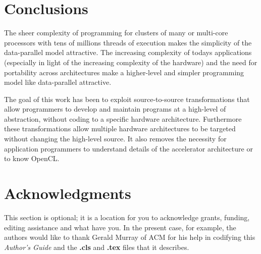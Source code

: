 \documentclass{acm_proc_article-sp}
\begin{document}





%


\section{Conclusions}

The sheer complexity of programming for clusters of many or multi-core
processors with tens of millions threads of execution makes the simplicity of
the data-parallel model attractive.  The increasing complexity of
todays applications (especially in light of the increasing complexity
of the hardware) and the need for portability across architectures
make a higher-level and simpler programming model like data-parallel
attractive.

The goal of this work has been to exploit source-to-source transformations that
allow programmers to develop and maintain programs at a high-level of
abstraction, without coding to a specific hardware architecture.
Furthermore these transformations allow multiple hardware architectures
to be targeted without changing the high-level source.  It also removes the
necessity for application programmers to understand details of the accelerator
architecture or to know OpenCL.

\section{Acknowledgments}
This section is optional; it is a location for you
to acknowledge grants, funding, editing assistance and
what have you.  In the present case, for example, the
authors would like to thank Gerald Murray of ACM for
his help in codifying this \textit{Author's Guide}
and the \textbf{.cls} and \textbf{.tex} files that it describes.





\balancecolumns
\end{document}
